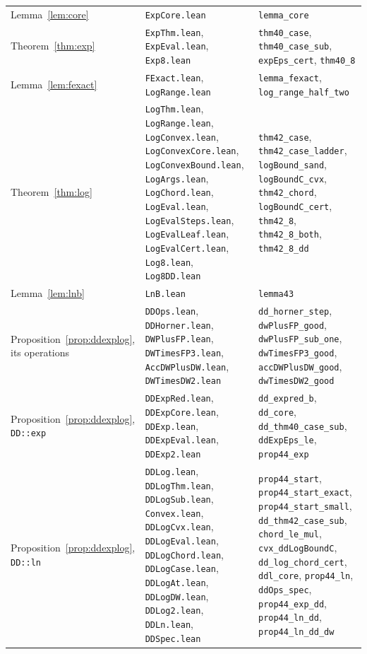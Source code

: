 \begin{table}[tp]
\begin{tabular}{@{}>{\raggedright\arraybackslash}p{3.3cm}>{\raggedright\arraybackslash}p{5.0cm}>{\raggedright\arraybackslash}p{8.6cm}@{}}
Lemma~\ref{lem:core} & \texttt{ExpCore.lean} & \texttt{lemma\_core} \\
Theorem~\ref{thm:exp} & \texttt{ExpThm.lean}, \texttt{ExpEval.lean}, \texttt{Exp8.lean} & \texttt{thm40\_case},
  \texttt{thm40\_case\_sub}, \texttt{expEps\_cert}, \texttt{thm40\_8} \\
Lemma~\ref{lem:fexact} & \texttt{FExact.lean}, \texttt{LogRange.lean} & \texttt{lemma\_fexact},
  \texttt{log\_range\_half\_two} \\
Theorem~\ref{thm:log} & \texttt{LogThm.lean}, \texttt{LogRange.lean}, \texttt{LogConvex.lean},
  \texttt{LogConvexCore.lean}, \texttt{LogConvexBound.lean}, \texttt{LogArgs.lean}, \texttt{LogChord.lean},
  \texttt{LogEval.lean}, \texttt{LogEvalSteps.lean}, \texttt{LogEvalLeaf.lean}, \texttt{LogEvalCert.lean},
  \texttt{Log8.lean}, \texttt{Log8DD.lean} & \texttt{thm42\_case}, \texttt{thm42\_case\_ladder},
  \texttt{logBound\_sand}, \texttt{logBoundC\_cvx}, \texttt{thm42\_chord}, \texttt{logBoundC\_cert},
  \texttt{thm42\_8}, \texttt{thm42\_8\_both}, \texttt{thm42\_8\_dd} \\
Lemma~\ref{lem:lnb} & \texttt{LnB.lean} & \texttt{lemma43} \\
Proposition~\ref{prop:ddexplog}, its operations & \texttt{DDOps.lean}, \texttt{DDHorner.lean},
  \texttt{DWPlusFP.lean}, \texttt{DWTimesFP3.lean}, \texttt{AccDWPlusDW.lean}, \texttt{DWTimesDW2.lean} &
  \texttt{dd\_horner\_step}, \texttt{dwPlusFP\_good}, \texttt{dwPlusFP\_sub\_one}, \texttt{dwTimesFP3\_good},
  \texttt{accDWPlusDW\_good}, \texttt{dwTimesDW2\_good} \\
Proposition~\ref{prop:ddexplog}, \texttt{DD::exp} & \texttt{DDExpRed.lean}, \texttt{DDExpCore.lean},
  \texttt{DDExp.lean}, \texttt{DDExpEval.lean}, \texttt{DDExp2.lean} & \texttt{dd\_expred\_b}, \texttt{dd\_core},
  \texttt{dd\_thm40\_case\_sub}, \texttt{ddExpEps\_le}, \texttt{prop44\_exp} \\
Proposition~\ref{prop:ddexplog}, \texttt{DD::ln} & \texttt{DDLog.lean}, \texttt{DDLogThm.lean},
  \texttt{DDLogSub.lean}, \texttt{Convex.lean}, \texttt{DDLogCvx.lean}, \texttt{DDLogEval.lean},
  \texttt{DDLogChord.lean}, \texttt{DDLogCase.lean}, \texttt{DDLogAt.lean}, \texttt{DDLogDW.lean},
  \texttt{DDLog2.lean}, \texttt{DDLn.lean}, \texttt{DDSpec.lean} & \texttt{prop44\_start},
  \texttt{prop44\_start\_exact}, \texttt{prop44\_start\_small}, \texttt{dd\_thm42\_case\_sub}, \texttt{chord\_le\_mul},
  \texttt{cvx\_ddLogBoundC}, \texttt{dd\_log\_chord\_cert}, \texttt{ddl\_core}, \texttt{prop44\_ln},
  \texttt{ddOps\_spec}, \texttt{prop44\_exp\_dd}, \texttt{prop44\_ln\_dd}, \texttt{prop44\_ln\_dd\_dw} \\

\end{tabular}
\end{table}
